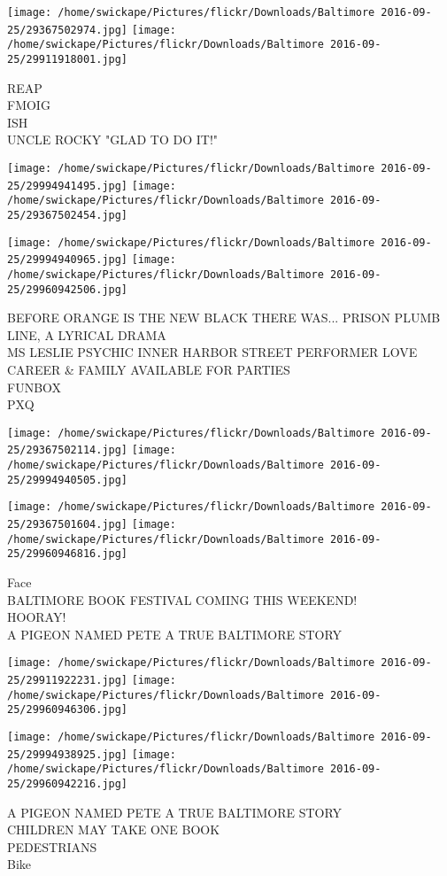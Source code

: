 \documentclass[10pt,letterpaper]{article}
\begin{document}
\texttt{[image: /home/swickape/Pictures/flickr/Downloads/Baltimore 2016-09-25/29367502974.jpg]}
\texttt{[image: /home/swickape/Pictures/flickr/Downloads/Baltimore 2016-09-25/29911918001.jpg]}

REAP\\
FMOIG\\
ISH\\
UNCLE ROCKY "GLAD TO DO IT!"\\
\pagebreak

\texttt{[image: /home/swickape/Pictures/flickr/Downloads/Baltimore 2016-09-25/29994941495.jpg]}
\texttt{[image: /home/swickape/Pictures/flickr/Downloads/Baltimore 2016-09-25/29367502454.jpg]}

\texttt{[image: /home/swickape/Pictures/flickr/Downloads/Baltimore 2016-09-25/29994940965.jpg]}
\texttt{[image: /home/swickape/Pictures/flickr/Downloads/Baltimore 2016-09-25/29960942506.jpg]}

BEFORE ORANGE IS THE NEW BLACK THERE WAS... PRISON PLUMB LINE, A LYRICAL DRAMA\\
MS LESLIE PSYCHIC INNER HARBOR STREET PERFORMER LOVE CAREER \& FAMILY AVAILABLE FOR PARTIES\\
FUNBOX\\
PXQ\\
\pagebreak

\texttt{[image: /home/swickape/Pictures/flickr/Downloads/Baltimore 2016-09-25/29367502114.jpg]}
\texttt{[image: /home/swickape/Pictures/flickr/Downloads/Baltimore 2016-09-25/29994940505.jpg]}

\texttt{[image: /home/swickape/Pictures/flickr/Downloads/Baltimore 2016-09-25/29367501604.jpg]}
\texttt{[image: /home/swickape/Pictures/flickr/Downloads/Baltimore 2016-09-25/29960946816.jpg]}

Face\\
BALTIMORE BOOK FESTIVAL COMING THIS WEEKEND!\\
HOORAY!\\
A PIGEON NAMED PETE A TRUE BALTIMORE STORY\\
\pagebreak

\texttt{[image: /home/swickape/Pictures/flickr/Downloads/Baltimore 2016-09-25/29911922231.jpg]}
\texttt{[image: /home/swickape/Pictures/flickr/Downloads/Baltimore 2016-09-25/29960946306.jpg]}

\texttt{[image: /home/swickape/Pictures/flickr/Downloads/Baltimore 2016-09-25/29994938925.jpg]}
\texttt{[image: /home/swickape/Pictures/flickr/Downloads/Baltimore 2016-09-25/29960942216.jpg]}

A PIGEON NAMED PETE A TRUE BALTIMORE STORY\\
CHILDREN MAY TAKE ONE BOOK\\
PEDESTRIANS\\
Bike\\
\pagebreak
\end{document}
